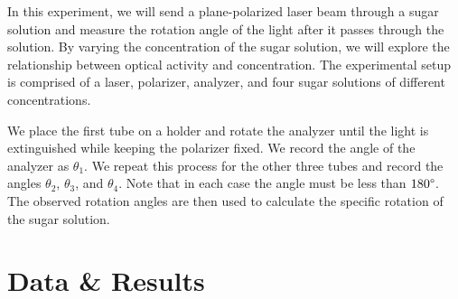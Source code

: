 \documentclass[10pt]{article}
\begin{document}
In this experiment, we will send a plane-polarized laser beam through a sugar solution and measure the rotation angle of the light after it passes through the solution. By varying the concentration of the sugar solution, we will explore the relationship between optical activity and concentration. The experimental setup is comprised of a laser, polarizer, analyzer, and four sugar solutions of different concentrations. 

We place the first tube on a holder and rotate the analyzer until the light is extinguished while keeping the polarizer fixed. We record the angle of the analyzer as $\theta_1$. We repeat this process for the other three tubes and record the angles $\theta_2$, $\theta_3$, and $\theta_4$. Note that in each case the angle must be less than $180\degree$. The observed rotation angles are then used to calculate the specific rotation of the sugar solution. 

\section{Data \& Results}
\end{document}
